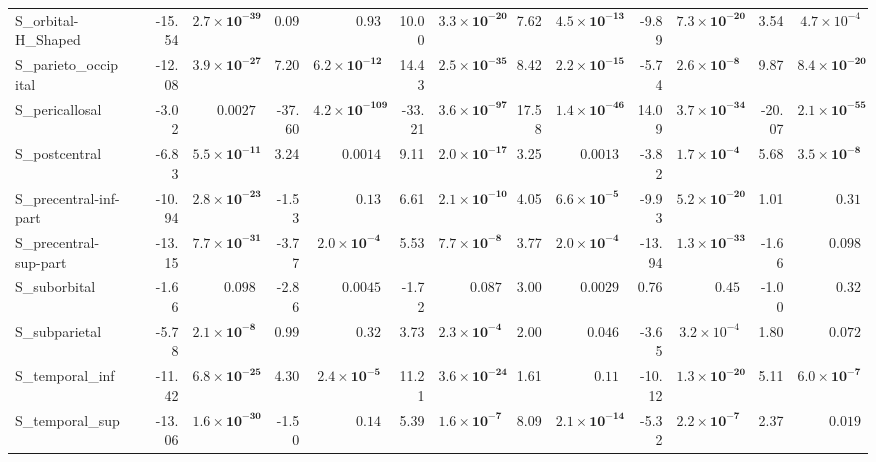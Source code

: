 {\begin{longtable}{llrrrrrrrrrrrr}
S\_orbital-H\_Shaped &  & -15.54 & $\mathbf{2.7{\times}10^{-39}}$ & 0.09 & $0.93$ & 10.00 & $\mathbf{3.3{\times}10^{-20}}$ & 7.62 & $\mathbf{4.5{\times}10^{-13}}$ & -9.89 & $\mathbf{7.3{\times}10^{-20}}$ & 3.54 & $4.7{\times}10^{-4}$ \\
S\_parieto\_occipital &  & -12.08 & $\mathbf{3.9{\times}10^{-27}}$ & 7.20 & $\mathbf{6.2{\times}10^{-12}}$ & 14.43 & $\mathbf{2.5{\times}10^{-35}}$ & 8.42 & $\mathbf{2.2{\times}10^{-15}}$ & -5.74 & $\mathbf{2.6{\times}10^{-8}}$ & 9.87 & $\mathbf{8.4{\times}10^{-20}}$ \\
S\_pericallosal &  & -3.02 & $0.0027$ & -37.60 & $\mathbf{4.2{\times}10^{-109}}$ & -33.21 & $\mathbf{3.6{\times}10^{-97}}$ & 17.58 & $\mathbf{1.4{\times}10^{-46}}$ & 14.09 & $\mathbf{3.7{\times}10^{-34}}$ & -20.07 & $\mathbf{2.1{\times}10^{-55}}$ \\
S\_postcentral &  & -6.83 & $\mathbf{5.5{\times}10^{-11}}$ & 3.24 & $0.0014$ & 9.11 & $\mathbf{2.0{\times}10^{-17}}$ & 3.25 & $0.0013$ & -3.82 & $\mathbf{1.7{\times}10^{-4}}$ & 5.68 & $\mathbf{3.5{\times}10^{-8}}$ \\
S\_precentral-inf-part &  & -10.94 & $\mathbf{2.8{\times}10^{-23}}$ & -1.53 & $0.13$ & 6.61 & $\mathbf{2.1{\times}10^{-10}}$ & 4.05 & $\mathbf{6.6{\times}10^{-5}}$ & -9.93 & $\mathbf{5.2{\times}10^{-20}}$ & 1.01 & $0.31$ \\
S\_precentral-sup-part &  & -13.15 & $\mathbf{7.7{\times}10^{-31}}$ & -3.77 & $\mathbf{2.0{\times}10^{-4}}$ & 5.53 & $\mathbf{7.7{\times}10^{-8}}$ & 3.77 & $\mathbf{2.0{\times}10^{-4}}$ & -13.94 & $\mathbf{1.3{\times}10^{-33}}$ & -1.66 & $0.098$ \\
S\_suborbital &  & -1.66 & $0.098$ & -2.86 & $0.0045$ & -1.72 & $0.087$ & 3.00 & $0.0029$ & 0.76 & $0.45$ & -1.00 & $0.32$ \\
S\_subparietal &  & -5.78 & $\mathbf{2.1{\times}10^{-8}}$ & 0.99 & $0.32$ & 3.73 & $\mathbf{2.3{\times}10^{-4}}$ & 2.00 & $0.046$ & -3.65 & $3.2{\times}10^{-4}$ & 1.80 & $0.072$ \\
S\_temporal\_inf &  & -11.42 & $\mathbf{6.8{\times}10^{-25}}$ & 4.30 & $\mathbf{2.4{\times}10^{-5}}$ & 11.21 & $\mathbf{3.6{\times}10^{-24}}$ & 1.61 & $0.11$ & -10.12 & $\mathbf{1.3{\times}10^{-20}}$ & 5.11 & $\mathbf{6.0{\times}10^{-7}}$ \\
S\_temporal\_sup &  & -13.06 & $\mathbf{1.6{\times}10^{-30}}$ & -1.50 & $0.14$ & 5.39 & $\mathbf{1.6{\times}10^{-7}}$ & 8.09 & $\mathbf{2.1{\times}10^{-14}}$ & -5.32 & $\mathbf{2.2{\times}10^{-7}}$ & 2.37 & $0.019$ \\

\end{longtable}}
